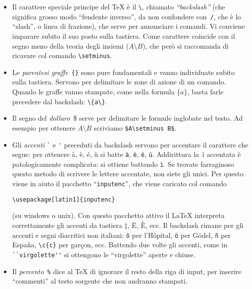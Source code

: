 \begin{itemize}

\item Il carattere speciale principe del \TeX{} è il
\verb!\!, chiamato \emph{``backslash''}
(che significa grosso modo ``fendente inverso'', da non
confondere con~\verb!/!, che è lo ``slash'', o linea di
frazione), che serve per annunciare i comandi. Vi conviene
imparare subito il suo posto sulla tastiera. Come carattere
coincide con il segno meno della teoria degli insiemi
($A\setminus B$), che
però si raccomanda di ricavare col comando
\verb!\setminus!.

\item Le \emph{parentesi
graffe}~\verb!{}! sono pure
fondamentali e vanno individuate subito sulla tastiera.
Servono per delimitare le zone di azione di un comando.
Quando le graffe vanno stampate, come nella formula
$\{a\}$, basta farle precedere dal backslash:
\verb!\{a\}!.

\item Il segno del \emph{dollaro}~\$  serve per delimitare le formule inglobate nel
testo. Ad esempio per ottenere $A\setminus B$ scriviamo
\verb!$A\setminus B$!.

\item Gli \emph{accenti} \verb!`! e \verb!'!
preceduti da backslash servono per accentare il carattere
che segue: per ottenere à, è, é, ù si batte
\verb!à!, \verb!è!, \verb!é!, \verb!ù!. Addirittura
la~ì accentata è patologicamente complicata: si
ottiene battendo \verb!ì!. Se trovate farraginoso
questo metodo di scrivere le lettere accentate, non siete
gli unici. Per questo viene in aiuto il pacchetto
``\verb!inputenc!'', che viene caricato col comando \begin{center}\verb!\usepackage[latin1]{inputenc}!\end{center} (su windows o unix).
Con questo pacchetto attivo il \LaTeX{} interpreta
correttamente gli accenti da tastiera ‡, Ë, È, ecc.
Il backslash rimane per gli accenti e segni diacritici
non italiani: \verb!ô! per l'Hôpital,
\verb!ö! per Gödel, \verb!ñ!
per España, \verb!\c{c}! per gar\c{c}on, ecc.
Battendo due volte gli accenti, come in
\verb!``virgolette''! si ottengono le
``virgolette'' aperte e chiuse.

\item Il \emph{percento}~\verb!%! dice al \TeX{} di ignorare il resto della riga di
input, per inserire ``commenti'' al testo sorgente che non
andranno stampati.


\end{itemize}
